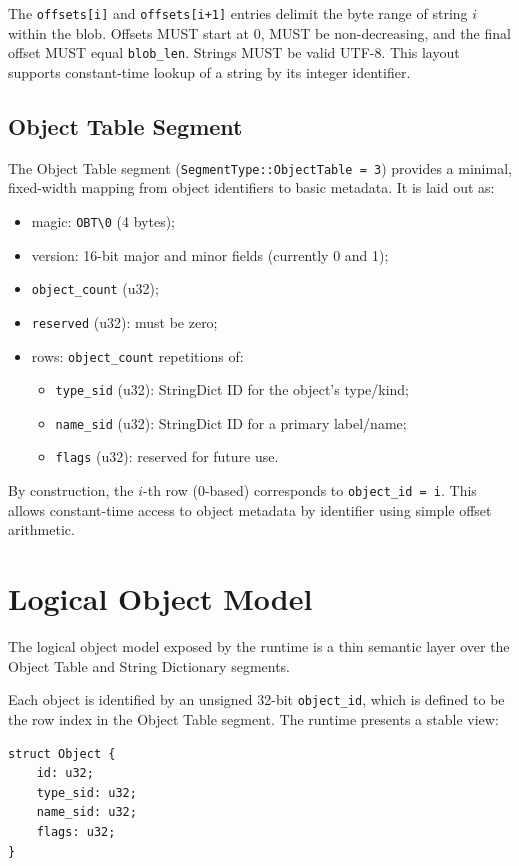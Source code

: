 \documentclass[11pt]{article}
\begin{document}
The \verb|offsets[i]| and \verb|offsets[i+1]| entries delimit the byte
range of string $i$ within the blob. Offsets MUST start at 0, MUST be
non-decreasing, and the final offset MUST equal \verb|blob_len|.
Strings MUST be valid UTF-8. This layout supports constant-time
lookup of a string by its integer identifier.

\subsection{Object Table Segment}
\label{sec:object-table}

The Object Table segment (\texttt{SegmentType::ObjectTable = 3})
provides a minimal, fixed-width mapping from object identifiers to
basic metadata. It is laid out as:
\begin{itemize}
  \item magic: \verb|OBT\0| (4 bytes);
  \item version: 16-bit major and minor fields (currently 0 and 1);
  \item \verb|object_count| (u32);
  \item \verb|reserved| (u32): must be zero;
  \item rows: \verb|object_count| repetitions of:
  \begin{itemize}
    \item \verb|type_sid| (u32): StringDict ID for the object's
          type/kind;
    \item \verb|name_sid| (u32): StringDict ID for a primary
          label/name;
    \item \verb|flags| (u32): reserved for future use.
  \end{itemize}
\end{itemize}

By construction, the $i$-th row (0-based) corresponds to
\verb|object_id = i|. This allows constant-time access to object
metadata by identifier using simple offset arithmetic.

\section{Logical Object Model}

The logical object model exposed by the runtime is a thin semantic
layer over the Object Table and String Dictionary segments.

Each object is identified by an unsigned 32-bit \verb|object_id|,
which is defined to be the row index in the Object Table segment. The
runtime presents a stable view:
\begin{verbatim}
struct Object {
    id: u32;
    type_sid: u32;
    name_sid: u32;
    flags: u32;
}
\end{verbatim}
\end{document}
